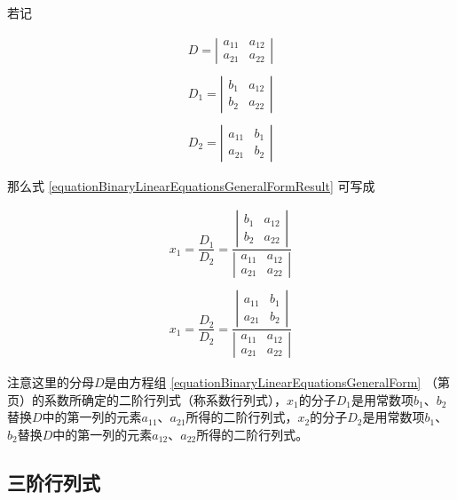 若记

\begin{equation}
	\begin{array}{r}
	D = \left | \begin{array}{cc}
			a_{11} & a_{12}\\
			a_{21} & a_{22}
			\end{array} \right | \\
	\\
	D_{1} = \left | \begin{array}{cc}
		b_{1} & a_{12}\\
		b_{2} & a_{22}
		\end{array} \right | \\
	\\
	D_{2} = \left | \begin{array}{cc}
		a_{11} & b_{1}\\
		a_{21} & b_{2}
		\end{array} \right |
	\end{array}
\end{equation}

那么式 \ref{equationBinaryLinearEquationsGeneralFormResult} 可写成

\begin{equation}
	\begin{array}{r}
	x_{1}= \dfrac{D_{1}}{D_{2}} = \dfrac{\left | \begin{array}{cc}
			b_{1} & a_{12}\\
			b_{2} & a_{22}
			\end{array} \right |}{\left | \begin{array}{cc}
				a_{11} & a_{12}\\
				a_{21} & a_{22}
				\end{array} \right |}\\
	\\
	
	x_{1}= \dfrac{D_{2}}{D_{2}} = \dfrac{\left | \begin{array}{cc}
			a_{11} & b_{1}\\
			a_{21} & b_{2}
			\end{array} \right |}{\left | \begin{array}{cc}
					a_{11} & a_{12}\\
					a_{21} & a_{22}
					\end{array} \right |}
	\end{array}
\end{equation}

注意这里的分母$ D $是由方程组 \ref{equationBinaryLinearEquationsGeneralForm} （第\pageref{equationBinaryLinearEquationsGeneralForm}页）的系数所确定的二阶行列式（称系数行列式），$ x_{1} $的分子$ D_{1} $是用常数项$ b_{1} $、$ b_{2} $替换$ D $中的第一列的元素$ a_{11} $、$ a_{21} $所得的二阶行列式，$ x_{2} $的分子$ D_{2} $是用常数项$ b_{1} $、$ b_{2} $替换$ D $中的第一列的元素$ a_{12} $、$ a_{22} $所得的二阶行列式。

\subsection{三阶行列式}